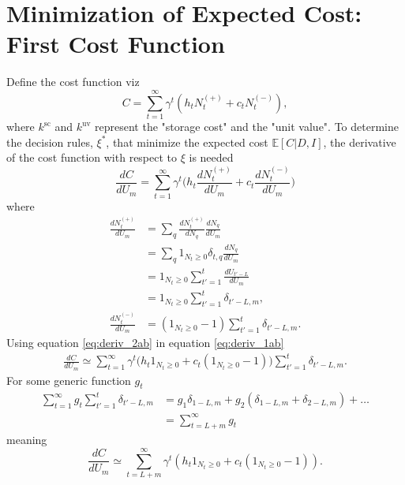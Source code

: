 \section{Minimization of Expected Cost: First Cost Function}
\label{app:deriva}
Define the cost function viz
\begin{equation}
	C = \sum_{t=1}^{\infty}\gamma^{t}(h_tN_t^{(+)}+c_tN_t^{(-)}),
\end{equation}
where $k^\text{sc}$ and $k^\text{uv}$ represent the "storage cost" and the "unit value". To determine the decision rules, $\xi^*$, that minimize the expected cost $\mathbb{E}[C|D,I]$, the derivative of the cost function with respect to $\xi$ is needed
\begin{equation}
		\frac{dC}{dU_m} = \sum_{t=1}^{\infty}\gamma^{t}\bigg(h_t\frac{dN_{t}^{(+)}}{dU_m}+c_t\frac{dN_{t}^{(-)}}{dU_m}\bigg)
	\label{eq:deriv_1ab}
\end{equation}
where
\begin{equation}
	\begin{split}
		\frac{dN_{t}^{(+)}}{dU_m}& =\sum_q 	\frac{dN_{t}^{(+)}}{dN_q}\frac{dN_q}{dU_m}\\
		& =\sum_q 	1_{N_{t}\geq 0}\delta_{t,q}\frac{dN_q}{dU_m}\\
		& = 1_{N_{t}\geq 0}\sum_{t'=1}^t\frac{dU_{t'-L}}{dU_m}\\
		& = 1_{N_{t}\geq 0}\sum_{t'=1}^t\delta_{t'-L,m},\\
		\frac{dN_{t}^{(-)}}{dU_m} &= (1_{N_t\geq 0}-1)\sum_{t'=1}^t\delta_{t'-L,m}.
		\label{eq:deriv_2ab}
	\end{split}
\end{equation}
Using equation \eqref{eq:deriv_2ab} in equation \eqref{eq:deriv_1ab} 
\begin{equation}
	\begin{split}
		\frac{dC}{dU_m} \simeq \sum_{t=1}^{\infty}\gamma^{t}\bigg(h_t1_{N_t\geq 0}+c_t(1_{N_t\geq 0}-1)\bigg)\sum_{t'=1}^t\delta_{t'-L,m}.
	\end{split}
\end{equation}
For some generic function $g_t$
\begin{equation}
	\begin{split}
		\sum_{t=1}^{\infty}g_t\sum_{t'=1}^t\delta_{t'-L,m} & = g_1\delta_{1-L,m}+g_2(\delta_{1-L,m}+\delta_{2-L,m})+\dots\\
		&=\sum_{t=L+m}^\infty g_t
	\end{split}
\end{equation}
meaning
\begin{equation}
	\frac{dC}{dU_m} \simeq \sum_{t=L+m}^{\infty}\gamma^{t}(h_t1_{N_t\geq 0}+c_t(1_{N_t\geq 0}-1)).
	\label{eq:deriv_3a}
\end{equation}
